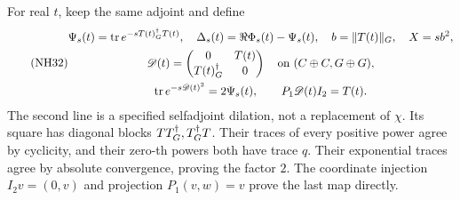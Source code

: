 For real \(t\), keep the same adjoint and define
\begin{equation}\tag{NH32}\label{nhp:NH32}
\begin{gathered}
\Psi_s(t)=\operatorname{tr} e^{-sT(t)^\dagger_G T(t)},\quad
\Delta_s(t)=\Re\Phi_s(t)-\Psi_s(t),\quad
b=\|T(t)\|_G,\quad X=sb^2,\\
\mathscr D(t)=\begin{pmatrix}0&T(t)\\T(t)^\dagger_G&0\end{pmatrix}
\quad\hbox{on }(C\oplus C,G\oplus G),\\
\operatorname{tr} e^{-s\mathscr D(t)^2}=2\Psi_s(t),\qquad
P_1\mathscr D(t)I_2=T(t).
\end{gathered}
\end{equation}
The second line is a specified selfadjoint dilation, not
a replacement of \(\chi\). Its square has diagonal
blocks \(TT^\dagger_G,T^\dagger_G T\). Their traces of every positive
power agree by cyclicity, and their zero-th powers both
have trace \(q\). Their exponential traces agree by
absolute convergence, proving the factor \(2\).
The coordinate injection \(I_2v=(0,v)\) and projection
\(P_1(v,w)=v\) prove the last map directly.

